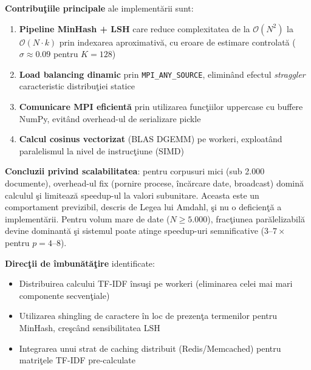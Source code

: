 \documentclass[a4paper,12pt]{report}
\begin{document}
\textbf{Contribu\c{t}iile principale} ale implement\u{a}rii sunt:
\begin{enumerate}
  \item \textbf{Pipeline MinHash + LSH} care reduce complexitatea de la $\mathcal{O}(N^2)$ la $\mathcal{O}(N \cdot k)$ prin indexarea aproximativ\u{a}, cu eroare de estimare controlat\u{a} ($\sigma \approx 0.09$ pentru $K=128$)
  \item \textbf{Load balancing dinamic} prin \texttt{MPI\_ANY\_SOURCE}, eliminând efectul \textit{straggler} caracteristic distribu\c{t}iei statice
  \item \textbf{Comunicare MPI eficient\u{a}} prin utilizarea func\c{t}iilor uppercase cu buffere NumPy, evit\^{a}nd overhead-ul de serializare pickle
  \item \textbf{Calcul cosinus vectorizat} (BLAS DGEMM) pe workeri, exploat\^{a}nd paralelismul la nivel de instruc\c{t}iune (SIMD)
\end{enumerate}

\textbf{Concluzii privind scalabilitatea}: pentru corpusuri mici (sub 2.000 documente), overhead-ul fix (pornire procese, \^{i}nc\u{a}rcare date, broadcast) domin\u{a} calculul \c{s}i limiteaz\u{a} speedup-ul la valori subunitare. Aceasta este un comportament previzibil, descris de Legea lui Amdahl, \c{s}i nu o deficien\c{t}\u{a} a implement\u{a}rii. Pentru volum mare de date ($N \geq 5.000$), frac\c{t}iunea par\u{a}lelizabil\u{a} devine dominant\u{a} \c{s}i sistemul poate atinge speedup-uri semnificative ($3$–$7\times$ pentru $p=4$–$8$).

\textbf{Direc\c{t}ii de \^{i}mbun\u{a}t\u{a}\c{t}ire} identificate:
\begin{itemize}
  \item Distribuirea calcului TF-IDF \^{i}nsu\c{s}i pe workeri (eliminarea celei mai mari componente secven\c{t}iale)
  \item Utilizarea shingling de caractere \^{i}n loc de prezen\c{t}a termenilor pentru MinHash, cre\c{s}c\^{a}nd sensibilitatea LSH
  \item Integrarea unui strat de caching distribuit (Redis/Memcached) pentru matri\c{t}ele TF-IDF pre-calculate
\end{itemize}
\end{document}
